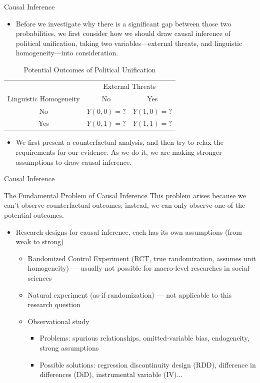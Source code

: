 \documentclass{beamer}
\begin{document}
	\begin{frame}{Causal Inference}
		\begin{itemize}
			\item Before we investigate why there is a significant gap between those two probabilities, we first consider how we should draw causal inference of political unification, taking two variables---external threats, and linguistic homogeneity---into consideration.
		\end{itemize}
		\begin{table}[h]
			\centering
			\caption{Potential Outcomes of Political Unification}
			\begin{tabular}{ccc}
				\toprule
				 & \multicolumn{2}{c}{External Threats} \\
				\cmidrule{2-3}
				Linguistic Homogeneity & No & Yes \\
				\midrule
				No & $Y(0,0)=?$  & $Y(1,0)=?$ \\
				Yes & $Y(0,1)=?$ & $Y(1,1)=?$ \\
				\bottomrule
			\end{tabular}
		\end{table}
		\begin{itemize}
			\item We first present a counterfactual analysis, and then try to relax the requirements for our evidence. As we do it, we are making stronger assumptions to draw causal inference.
		\end{itemize}
	\end{frame}
	
	\begin{frame}{Causal Inference}
		\begin{block}{The Fundamental Problem of Causal Inference}
			This problem arises because we can't observe counterfactual outcomes; instead, we can only observe one of the potential outcomes.
		\end{block}
		\begin{itemize}
			\item Research designs for causal inference, each has its own assumptions (from weak to strong)
			\begin{itemize}
				\item Randomized Control Experiment (RCT, true randomization, assumes unit homogeneity) --- usually not possible for macro-level researches in social sciences
				\item Natural experiment (as-if randomization) --- not applicable to this research question
				\item Observational study
				\begin{itemize}
					\item Problems: spurious relationships, omitted-variable bias, endogeneity, strong assumptions
					\item Possible solutions: regression discontinuity design (RDD), difference in differences (DiD), instrumental variable (IV)...
				\end{itemize}
			\end{itemize}
		\end{itemize}
	\end{frame}
	
\end{document}
